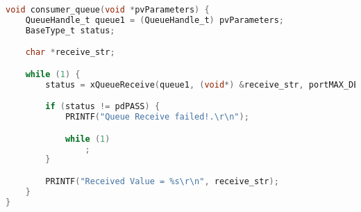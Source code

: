 \begin{lstlisting}[language=c,caption=Problem 2 Consumer Queue, label=list:p2_cons]
void consumer_queue(void *pvParameters) {
    QueueHandle_t queue1 = (QueueHandle_t) pvParameters;
    BaseType_t status;

    char *receive_str;

    while (1) {
        status = xQueueReceive(queue1, (void*) &receive_str, portMAX_DELAY);

        if (status != pdPASS) {
            PRINTF("Queue Receive failed!.\r\n");

            while (1)
                ;
        }

        PRINTF("Received Value = %s\r\n", receive_str);
    }
}
\end{lstlisting}
